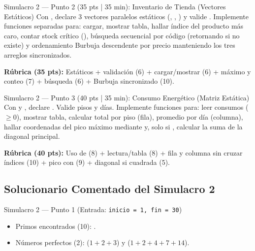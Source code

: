 \documentclass[11pt,letterpaper]{article}
\begin{document}
\begin{ejercicio}{Simulacro 2 — Punto 2 (35 pts | 35 min): Inventario de Tienda (Vectores Estáticos)}
Con , declare 3 vectores paralelos estáticos (, , ) y valide . Implemente funciones separadas para: cargar, mostrar tabla, hallar índice del producto más caro, contar stock crítico (), búsqueda secuencial por código (retornando  si no existe) y ordenamiento Burbuja descendente por precio manteniendo los tres arreglos sincronizados.

\textbf{Rúbrica (35 pts):} Estáticos + validación (6) + cargar/mostrar (6) + máximo y conteo (7) + búsqueda (6) + Burbuja sincronizado (10).
\end{ejercicio}

\begin{ejercicio}{Simulacro 2 — Punto 3 (40 pts | 35 min): Consumo Energético (Matriz Estática)}
Con  y , declare . Valide  pisos y  días. Implemente funciones para: leer consumos ($\ge 0$), mostrar tabla, calcular total por piso (fila), promedio por día (columna), hallar coordenadas del pico máximo mediante  y, solo si , calcular la suma de la diagonal principal.

\textbf{Rúbrica (40 pts):} Uso de \codigo{[][MAX\_D]} (8) + lectura/tabla (8) + fila y columna sin cruzar índices (10) + pico con \codigo{\&} (9) + diagonal si cuadrada (5).
\end{ejercicio}

\newpage
\subsection{Solucionario Comentado del Simulacro 2}



\begin{pruebaescritorio}{Simulacro 2 — Punto 1 (Entrada: \texttt{inicio = 1, fin = 30})}
\begin{itemize}
  \item Primos encontrados (10): .
  \item Números perfectos (2):  ($1+2+3$) y  ($1+2+4+7+14$).
\end{itemize}
\end{pruebaescritorio}
\end{document}
